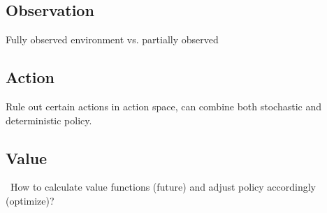 \documentclass{article}
\begin{document}
    \subsection{Observation}
      Fully observed environment vs. partially observed\
    \subsection{Action}
      Rule out certain actions in action space, can combine both stochastic and deterministic policy.
    \subsection{Value}\
      How to calculate value functions (future) and adjust policy accordingly (optimize)? 
\end{document}
